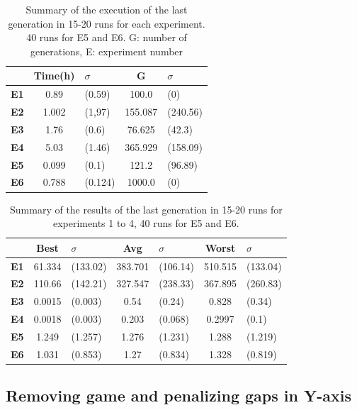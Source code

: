 \documentclass[a4paper,twoside]{article}
\newcommand{\myfloatalign}{\centering}
\begin{document}
\begin{table}
	\myfloatalign
	\begin{tabular}{cclcl}
		& \textbf{Time(h)} &$\sigma$ & \textbf{G}& $\sigma$ \\ \hline
		\textbf{E1}&0.89&(0.59)&100.0&(0)\\  \hline
		\textbf{E2}&1.002&(1,97)&155.087&(240.56) \\  \hline
		\textbf{E3}&1.76&(0.6)&76.625&(42.3)\\  \hline
		\textbf{E4}&5.03&(1.46)&365.929&(158.09)  \\  \hline
		\textbf{E5}&0.099&(0.1)&121.2&(96.89)     \\  \hline 
		\textbf{E6}&0.788&(0.124)&1000.0&(0) \\  \hline
		\hline
	\end{tabular}
	\caption{Summary of the execution of the last generation in 15-20 runs for each
		experiment. 40 runs for E5 and E6.
		G: number of generations, E: experiment 
		number} %
	\label{t:resOver1}
\end{table}

\begin{table}
	\myfloatalign
	\begin{tabular}{cclclcl}
		& \textbf{Best}& $\sigma$  &\textbf{Avg}&$\sigma$  & \textbf{Worst}&$\sigma$ \\ \hline
		\textbf{E1}&61.334&(133.02)&383.701&(106.14)&510.515&(133.04)\\  \hline
		\textbf{E2}&110.66&(142.21)&327.547&(238.33)&367.895&(260.83)  \\  \hline
		\textbf{E3}&0.0015&(0.003)&0.54&(0.24)&0.828&(0.34)   \\  \hline
		\textbf{E4}&0.0018&(0.003)&0.203&(0.068)&0.2997&(0.1)  \\  \hline
		\textbf{E5}& 1.249&(1.257)&1.276&(1.231)&1.288&(1.219)     \\  \hline 
		\textbf{E6}& 1.031&(0.853)&1.27&(0.834)&1.328&(0.819) \\  \hline
		\hline
	\end{tabular}
	\caption{Summary of the results of the last generation in
          15-20 runs for experiments 1 to 4, 40 runs for E5 and E6.} 
	\label{t:resOver2}
\end{table}

\subsection{Removing game and penalizing gaps in Y-axis}\label{E5}
\end{document}
